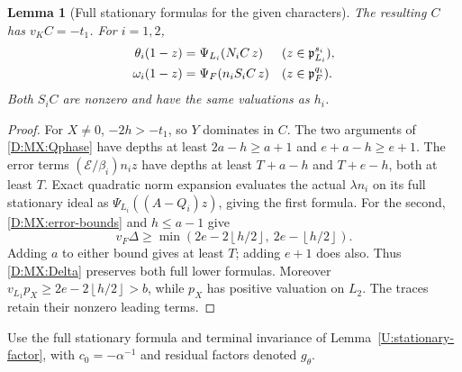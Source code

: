 \documentclass[11pt]{amsart}
\newtheorem{lemma}[theorem]{Lemma}
\theoremstyle{definition}
\theoremstyle{remark}
\newcommand{\floor}[1]{\left\lfloor #1\right\rfloor}
\begin{document}
\begin{lemma}[Full stationary formulas for the given characters]\label{D:MX:minimal-origin}
The resulting $C$ has $v_KC=-t_1$. For $i=1,2$,
\begin{align}\label{D:MX:minimal-stationary}
 \theta_i(1-z)&=\Psi_{L_i}(N_iC\,z)
                                &&(z\in\mathfrak p_{L_i}^{s_i}),\notag\\
 \omega_i(1-z)&=\Psi_F(n_iS_iC\,z)
                                &&(z\in\mathfrak p_F^{q_i}).
\end{align}
Both $S_iC$ are nonzero and have the same valuations as $h_i$.
\end{lemma}
\begin{proof}
For $X\ne0$, $-2h>-t_1$, so $Y$ dominates in $C$.
The two arguments of \eqref{D:MX:Qphase} have depths at least
$2a-h\ge a+1$ and $e+a-h\ge e+1$.
The error terms $(\mathcal E/\beta_i)n_i z$ have depths at least
$T+a-h$ and $T+e-h$, both at least $T$.
Exact quadratic norm expansion evaluates the actual $\lambda n_i$ on its
full stationary ideal as $\Psi_{L_i}((A-Q_i)z)$, giving the first formula.
For the second, \eqref{D:MX:error-bounds} and $h\le a-1$ give
\[
 v_F\Delta\ge\min(2e-2\floor{h/2},\ 2e-\floor{h/2}).
\]
Adding $a$ to either bound gives at least $T$; adding $e+1$ does also.
Thus \eqref{D:MX:Delta} preserves both full lower formulas.
Moreover $v_{L_1}p_X\ge2e-2\floor{h/2}>b$, while $p_X$ has positive
valuation on $L_2$. The traces retain their nonzero leading terms.
\end{proof}

Use the full stationary formula and terminal invariance of
Lemma~\ref{U:stationary-factor}, with $c_0=-\alpha^{-1}$ and
residual factors denoted $g_\theta$.
\end{document}
